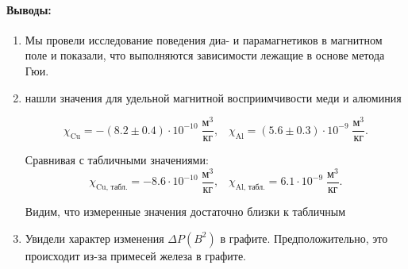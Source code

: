 \documentclass[a4paper,12pt]{article}
\begin{document}
\paragraph{Выводы:}
\begin{enumerate}
\itemsep0em
\item Мы провели исследование поведения диа- и парамагнетиков в магнитном поле и показали, что выполняются зависимости лежащие в основе метода Гюи.
\item нашли значения для удельной магнитной восприимчивости меди и алюминия

\[\chi_\text{Cu} = - (8.2 \pm 0.4) \cdot 10^{-10}\;\frac{\text{м}^3}{\text{кг}}, \;\;\; \chi_\text{Al} = (5.6 \pm 0.3) \cdot 10^{-9}\;\frac{\text{м}^3}{\text{кг}}.\]

Сравнивая с табличными значениями: 
\[\chi_\text{Cu, табл.} = - 8.6 \cdot 10^{-10}\;\frac{\text{м}^3}{\text{кг}}, \;\;\; \chi_\text{Al, табл.} = 6.1 \cdot 10^{-9}\;\frac{\text{м}^3}{\text{кг}}.\]

Видим, что измеренные значения достаточно близки к табличным
\item Увидели характер изменения $\Delta P(B^2)$ в графите. Предположительно, это происходит из-за примесей железа в графите.
\end{enumerate}
\end{document}
